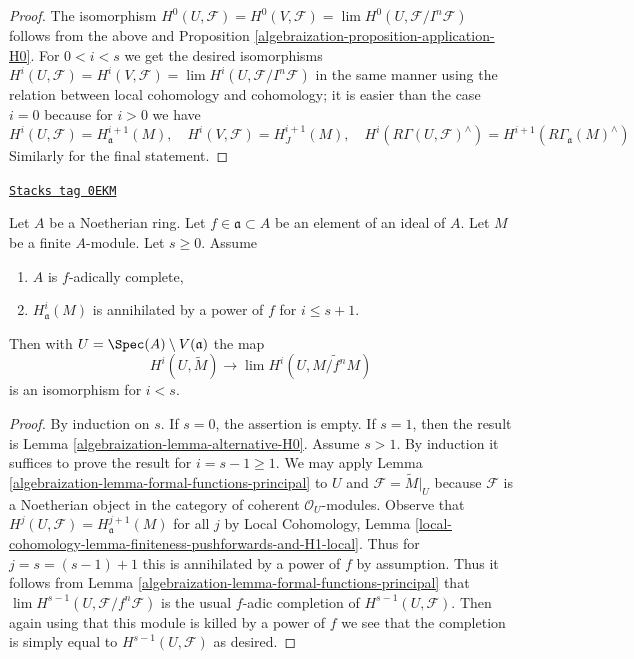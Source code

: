\begin{proof}
\medskip\noindent
The isomorphism $H^0(U, \mathcal{F}) = H^0(V, \mathcal{F}) =
\lim H^0(U, \mathcal{F}/I^n\mathcal{F})$ follows from the above and
Proposition \ref{algebraization-proposition-application-H0}.
For $0 < i < s$ we get the desired isomorphisms
$H^i(U, \mathcal{F}) = H^i(V, \mathcal{F}) =
\lim H^i(U, \mathcal{F}/I^n\mathcal{F})$ in
the same manner using the relation between local cohomology
and cohomology; it is easier than the case $i = 0$
because for $i > 0$ we have
$$
H^i(U, \mathcal{F}) = H^{i + 1}_\mathfrak a(M),
\quad
H^i(V, \mathcal{F}) = H^{i + 1}_J(M),
\quad
H^i(R\Gamma(U, \mathcal{F})^\wedge) =
H^{i + 1}(R\Gamma_\mathfrak a(M)^\wedge)
$$
Similarly for the final statement.
\end{proof}

\begin{lemma}
\label{algebraization-lemma-alternative-higher}
\href{https://stacks.math.columbia.edu/tag/0EKM}{\texttt{Stacks tag 0EKM}}

Let $A$ be a Noetherian ring. Let $f \in \mathfrak a \subset A$
be an element of an ideal of $A$. Let $M$ be a finite $A$-module.
Let $s \geq 0$. Assume
\begin{enumerate}
\item $A$ is $f$-adically complete,
\item $H^i_\mathfrak a(M)$ is annihilated by a power of $f$
for $i \leq s + 1$.
\end{enumerate}
Then with $U = \Spec(A) \setminus V(\mathfrak a)$ the map
$$
H^i(U, \widetilde{M})
\longrightarrow
\lim H^i(U, \widetilde{M/f^nM})
$$
is an isomorphism for $i < s$.
\end{lemma}

\begin{proof}

By induction on $s$. If $s = 0$, the assertion is empty. If $s = 1$, then
the result is Lemma \ref{algebraization-lemma-alternative-H0}. Assume $s > 1$. By induction
it suffices to prove the result for $i = s - 1 \geq 1$.
We may apply Lemma \ref{algebraization-lemma-formal-functions-principal}
to $U$ and $\mathcal{F} = \widetilde{M}|_U$
because $\mathcal{F}$ is a Noetherian object in
the category of coherent $\mathcal{O}_U$-modules.
Observe that $H^j(U, \mathcal{F}) = H^{j + 1}_\mathfrak a(M)$ for all $j$ by
Local Cohomology, Lemma
\ref{local-cohomology-lemma-finiteness-pushforwards-and-H1-local}.
Thus for $j = s = (s - 1) + 1$ this is
annihilated by a power of $f$ by assumption.
Thus it follows from
Lemma \ref{algebraization-lemma-formal-functions-principal} that
$\lim H^{s - 1}(U, \mathcal{F}/f^n\mathcal{F})$
is the usual $f$-adic completion of $H^{s - 1}(U, \mathcal{F})$.
Then again using that this module is killed by a power of
$f$ we see that the completion is simply equal to $H^{s - 1}(U, \mathcal{F})$
as desired.
\end{proof}

